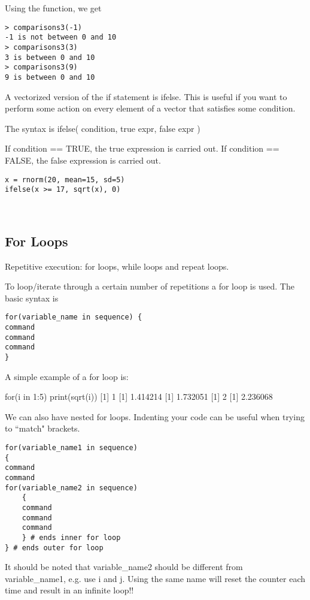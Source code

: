 Using the function, we get
\begin{verbatim}
> comparisons3(-1)
-1 is not between 0 and 10
> comparisons3(3)
3 is between 0 and 10
> comparisons3(9)
9 is between 0 and 10
\end{verbatim}
A vectorized version of the if statement is ifelse. This is useful if you want to perform some action on every element of a vector that satisfies some condition.

The syntax is
ifelse( condition, true expr, false expr )

If condition == TRUE, the true expression is carried out. 
If condition == FALSE, the false expression is carried out.
\begin{verbatim}
x = rnorm(20, mean=15, sd=5)
ifelse(x >= 17, sqrt(x), 0)
\end{verbatim}


 
\subsection{For Loops}

Repetitive execution: for loops, while loops and repeat loops.

To loop/iterate through a certain number of repetitions a for loop
is used. The basic syntax is
\begin{verbatim}
for(variable_name in sequence) {
command
command
command
}
\end{verbatim}

A simple example of a for loop is:

for(i in 1:5){
print(sqrt(i))
}
[1] 1
[1] 1.414214
[1] 1.732051
[1] 2
[1] 2.236068


We can also have nested for loops. Indenting your code can be useful
when trying to “match" brackets.
\begin{verbatim}
for(variable_name1 in sequence) 
{
command
command
for(variable_name2 in sequence)
    {
    command
    command 
    command
    } # ends inner for loop
} # ends outer for loop
\end{verbatim}
It should be noted that variable_name2 should be different from
variable_name1, e.g. use i and j. Using the same name will
reset the counter each time and result in an infinite loop!!



